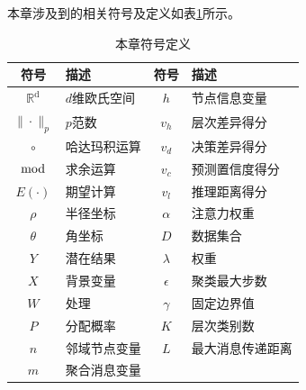 \documentclass[algorithmlist, AutoFakeBold, AutoFakeSlant, figurelist, tablelist, nomlist, engineering]{seuthesix}
\begin{document}
本章涉及到的相关符号及定义如表\ref{2_symbols}所示。
\begin{table}
  \centering
  \begin{tabular*}{0.8\textwidth}{@{\extracolsep{\fill}}clcl}
		\toprule[1pt]
    符号 & 描述 & 符号 & 描述 \\ \hline
    $\mathbb{R}^{\mathrm{d}}$ & $d$维欧氏空间 & $h$ & 节点信息变量\\
    $\|\cdot\|_{p}$ & $p$范数 & $v_h$ & 层次差异得分\\
    $\circ$ & 哈达玛积运算 & $v_d$ & 决策差异得分\\
    $\bmod$ & 求余运算 & $v_c$ & 预测置信度得分\\
    $E(\cdot)$ & 期望计算 & $v_l$ & 推理距离得分\\
    $\rho$ & 半径坐标 & $\alpha$ & 注意力权重\\
    $\theta$ & 角坐标 & $D$ & 数据集合\\
    $Y$ & 潜在结果 & $\lambda$ & 权重\\
    $X$ & 背景变量 & $\epsilon$ & 聚类最大步数\\
    $W$ & 处理 & $\gamma$ & 固定边界值\\
    $P$ & 分配概率 & $K$ & 层次类别数\\
    $n$ & 邻域节点变量 & $L$ & 最大消息传递距离\\
    $m$ & 聚合消息变量 & & \\
		\bottomrule[1pt]
	\end{tabular*}
  \caption{本章符号定义}
  \label{2_symbols}
\end{table}
\end{document}
